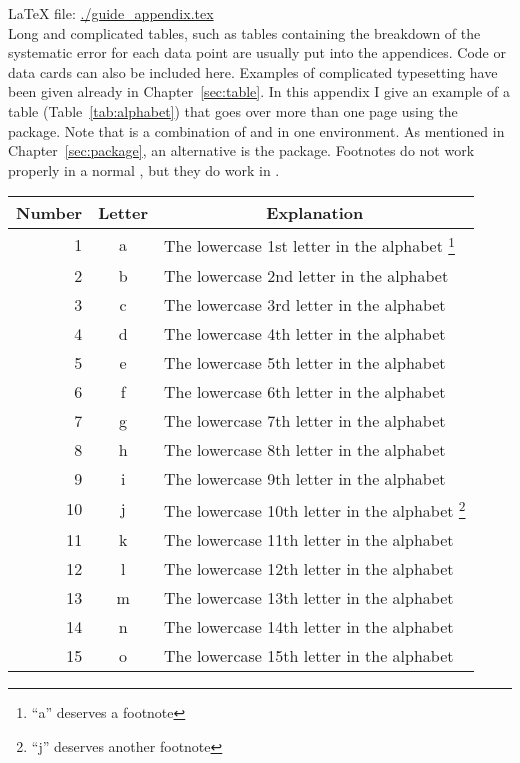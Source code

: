 \LaTeX{} file: \url{./guide_appendix.tex}\\[1ex]
\noindent
Long and complicated tables, such as tables containing the breakdown
of the systematic error for each data point are usually put into the
appendices. Code or data cards can also be included here.  Examples of
complicated typesetting have been given already in
Chapter~\ref{sec:table}. In this appendix I give an example of a table
(Table~\ref{tab:alphabet}) that goes over more than one page using the
 package. Note that  is a
combination of  and  in one
environment. As mentioned in Chapter~\ref{sec:package}, an alternative
is the  package. Footnotes do not work properly in a
normal , but they do work in .

\begin{longtable}{rcl}
  \toprule
  \multicolumn{1}{c}{Number} &
  \multicolumn{1}{c}{Letter} &
  \multicolumn{1}{c}{Explanation}\\
  \midrule
  \endhead
   1 & a & The lowercase 1st letter in the alphabet%
   \footnote{\enquote{a} deserves a footnote}\\
   2 & b & The lowercase 2nd letter in the alphabet\\
   3 & c & The lowercase 3rd letter in the alphabet\\
   4 & d & The lowercase 4th letter in the alphabet\\
   5 & e & The lowercase 5th letter in the alphabet\\
   6 & f & The lowercase 6th letter in the alphabet\\
   7 & g & The lowercase 7th letter in the alphabet\\
   8 & h & The lowercase 8th letter in the alphabet\\
   9 & i & The lowercase 9th letter in the alphabet\\
  10 & j & The lowercase 10th letter in the alphabet%
  \footnote{\enquote{j} deserves another footnote}\\
  11 & k & The lowercase 11th letter in the alphabet\\
  12 & l & The lowercase 12th letter in the alphabet\\
  13 & m & The lowercase 13th letter in the alphabet\\
  14 & n & The lowercase 14th letter in the alphabet\\
  15 & o & The lowercase 15th letter in the alphabet\\

\end{longtable}
